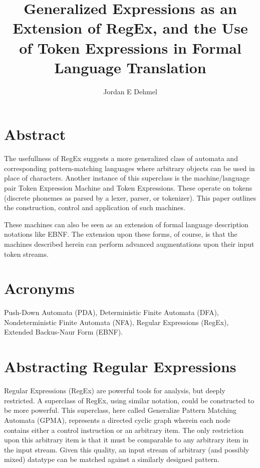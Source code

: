 \documentclass[8pt]{amsart}
\title{Generalized Expressions as an Extension of RegEx, and
    the Use of Token Expressions in Formal Language Translation}
\author{Jordan E Dehmel}
\begin{document}
\maketitle

\section{Abstract}

    The usefullness of RegEx suggests a more generalized class
    of automata and corresponding pattern-matching languages
    where arbitrary objects can be used in place of characters.
    Another instance of this superclass is the machine/language
    pair Token Expression Machine and Token Expressions. These
    operate on tokens (discrete phonemes as parsed by a lexer,
    parser, or tokenizer). This paper outlines the construction,
    control and application of such machines.

    These machines can also be seen as an extension of formal
    language description notations like EBNF. The extension upon
    these forms, of course, is that the machines described
    herein can perform advanced augmentations upon their input
    token streams.

\section{Acronyms}

    Push-Down Automata (PDA), Deterministic Finite Automata
    (DFA), Nondeterministic Finite Automata (NFA), Regular
    Expressions (RegEx), Extended Backus-Naur Form (EBNF).

\section{Abstracting Regular Expressions}

    Regular Expressions (RegEx) are powerful tools for analysis,
    but deeply restricted. A superclass of RegEx, using similar
    notation, could be constructed to be more powerful. This
    superclass, here called Generalize Pattern Matching Automata
    (GPMA), represents a directed cyclic graph wherein each node
    contains either a control instruction or an arbitrary item.
    The only restriction upon this arbitrary item is that it
    must be comparable to any arbitrary item in the input
    stream. Given this quality, an input stream of arbitrary
    (and possibly mixed) datatype can be matched against a
    similarly designed pattern.
\end{document}

